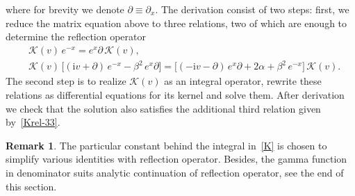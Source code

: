 \documentclass[11pt]{article}
\numberwithin{equation}{section}
\theoremstyle{plain}
\theoremstyle{definition}
\newtheorem{remark}{Remark}
\renewcommand{\imath}{\mathrm{i}}
\begin{document}
where for brevity we denote $\partial \equiv \partial_x$. The derivation consist of two steps: first, we reduce the matrix equation above to three relations, two of which are enough to determine the reflection operator
\begin{align} \label{Krel-1}
	&\mathcal{K}(v)\,e^{-x} = e^{x}\partial\,\mathcal{K}(v), \\[6pt]  \label{Krel-2}
	&\mathcal{K}(v) \, \bigl[ (\imath v + \partial)\,e^{-x} - \beta^2\,e^{x}\partial \bigr] =
	\bigl[ (-\imath v - \partial)\,e^{x}\partial + 2\alpha + \beta^2\,e^{-x} \bigr] \, \mathcal{K}(v).
\end{align}
The second step is to realize $\mathcal{K}(v)$ as an integral operator, rewrite these relations as differential equations for its kernel and solve them. After derivation we check that the solution also satisfies the additional third relation given by~\eqref{Krel-33}.

\begin{remark}
	The particular constant behind the integral in~\eqref{K} is chosen to simplify various identities with  reflection operator. Besides, the gamma function in denominator suits analytic continuation of reflection operator, see the end of this section.
\end{remark}
\end{document}
